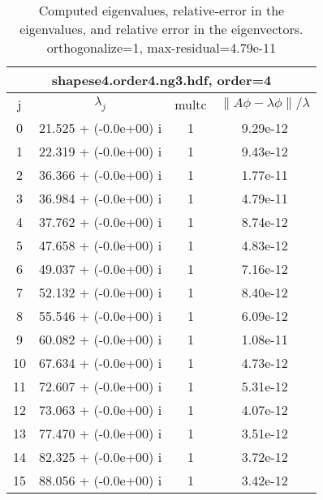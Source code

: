 \begin{table}[H]\tableFont %
\begin{center}
\begin{tabular}{|c|c|c|c|}  \hline
\multicolumn{4}{|c|}{shapese4.order4.ng3.hdf, order=4} \\ \hline
   j    &         $\lambda_j$      & multc & $\| A\phi - \lambda\phi\|/\lambda$     \\ \hline
     0  &     21.525 + (-0.0e+00) i   &   1     &    9.29e-12   \\
     1  &     22.319 + (-0.0e+00) i   &   1     &    9.43e-12   \\
     2  &     36.366 + (-0.0e+00) i   &   1     &    1.77e-11   \\
     3  &     36.984 + (-0.0e+00) i   &   1     &    4.79e-11   \\
     4  &     37.762 + (-0.0e+00) i   &   1     &    8.74e-12   \\
     5  &     47.658 + (-0.0e+00) i   &   1     &    4.83e-12   \\
     6  &     49.037 + (-0.0e+00) i   &   1     &    7.16e-12   \\
     7  &     52.132 + (-0.0e+00) i   &   1     &    8.40e-12   \\
     8  &     55.546 + (-0.0e+00) i   &   1     &    6.09e-12   \\
     9  &     60.082 + (-0.0e+00) i   &   1     &    1.08e-11   \\
    10  &     67.634 + (-0.0e+00) i   &   1     &    4.73e-12   \\
    11  &     72.607 + (-0.0e+00) i   &   1     &    5.31e-12   \\
    12  &     73.063 + (-0.0e+00) i   &   1     &    4.07e-12   \\
    13  &     77.470 + (-0.0e+00) i   &   1     &    3.51e-12   \\
    14  &     82.325 + (-0.0e+00) i   &   1     &    3.72e-12   \\
    15  &     88.056 + (-0.0e+00) i   &   1     &    3.42e-12   \\
\hline
\end{tabular}
\caption{Computed eigenvalues, relative-error in the eigenvalues, and relative error in the eigenvectors. orthogonalize=1, max-residual=4.79e-11
}\label{table:genEigsshapese4.order4.ng3.hdf}
\end{center}
\end{table}
